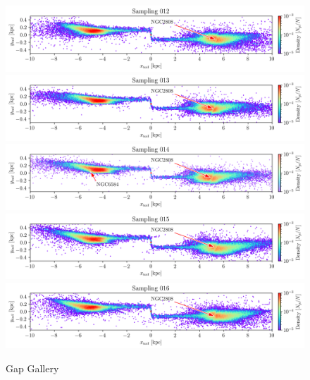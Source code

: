 \documentclass{aa}
\begin{document}
\begin{appendix}
    \begin{figure}
      \centering
      \includegraphics[width=\linewidth]{gallery_of_gaps_monte-carlo-012.png}
      \includegraphics[width=\linewidth]{gallery_of_gaps_monte-carlo-013.png}
      \includegraphics[width=\linewidth]{gallery_of_gaps_monte-carlo-014.png}      
      \includegraphics[width=\linewidth]{gallery_of_gaps_monte-carlo-015.png}
      \includegraphics[width=\linewidth]{gallery_of_gaps_monte-carlo-016.png}
      \caption{Gap Gallery}
      \label{fig:gallery3}
      \end{figure}        


\end{appendix}
\end{document}
